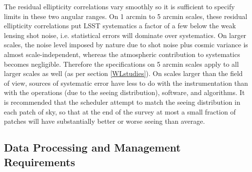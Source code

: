 The residual ellipticity correlations vary smoothly so it is sufficient to specify
limits in these two angular ranges.
On 1 arcmin to 5 arcmin scales, these residual
ellipticity correlations put LSST systematics a factor of a few below the
weak lensing shot noise, i.e. statistical errors will dominate over systematics.
On larger scales, the noise level imposed by nature due to shot noise plus
cosmic variance is almost scale-independent, whereas the atmospheric
contribution to systematics becomes negligible.  Therefore the
specifications on 5 arcmin scales apply to all larger scales as well
(as per section \ref{WLstudies}).  On scales larger than the field of view, sources of
systematic error have less to do with the instrumentation than with the operations
(due to the seeing distribution), software, and algorithms.  It is recommended
that the scheduler attempt to match the seeing distribution in each
patch of sky, so that at the end of the survey at most a small fraction
of patches will have substantially better or worse seeing than average.



\subsection{Data Processing and Management Requirements}


